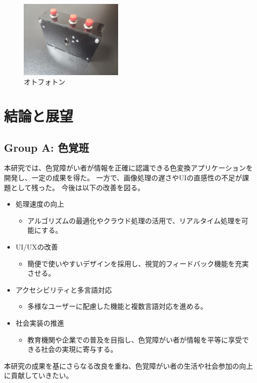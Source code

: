 \begin{figure}[h]
  \centering
  \includegraphics[width=0.45\textwidth]{pages/report/images/otophoton.jpg}
  \caption{オトフォトン}
  \label{fig:otophoton}
\end{figure}

\section{結論と展望}
\subsection{Group A: 色覚班}
本研究では、色覚障がい者が情報を正確に認識できる色変換アプリケーションを開発し、一定の成果を得た。
一方で、画像処理の遅さやUIの直感性の不足が課題として残った。
今後は以下の改善を図る。
\begin{itemize}
  \item 処理速度の向上
  \begin{itemize}
    \item アルゴリズムの最適化やクラウド処理の活用で、リアルタイム処理を可能にする。
  \end{itemize}
  \item UI/UXの改善
  \begin{itemize}
    \item 簡便で使いやすいデザインを採用し、視覚的フィードバック機能を充実させる。
  \end{itemize}
  \item アクセシビリティと多言語対応
  \begin{itemize}
    \item 多様なユーザーに配慮した機能と複数言語対応を進める。
  \end{itemize}
  \item 社会実装の推進
  \begin{itemize}
    \item 教育機関や企業での普及を目指し、色覚障がい者が情報を平等に享受できる社会の実現に寄与する。
  \end{itemize}
\end{itemize}
  本研究の成果を基にさらなる改良を重ね、色覚障がい者の生活や社会参加の向上に貢献していきたい。

